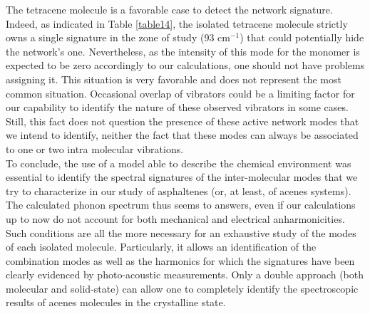 The tetracene molecule is a favorable case to detect the network signature. Indeed, as indicated in Table \ref{table14}, the isolated tetracene molecule strictly owns a single signature in the zone of study (93 cm$^{-1}$) that could potentially hide the network’s one. Nevertheless, as the intensity of this mode for the monomer is expected to be zero accordingly to our calculations, one should not have problems assigning it. This situation is very favorable and does not represent the most common situation. Occasional overlap of vibrators could be a limiting factor for our capability to identify the nature of these observed vibrators in some cases. Still, this fact does not question the presence of these active network modes that we intend to identify, neither the fact that these modes can always be associated to one or two intra molecular vibrations. \\

 
 To conclude, the use of a model able to describe the chemical environment was essential to identify the spectral signatures of the inter-molecular modes that we try to characterize in our study of asphaltenes (or, at least, of acenes systems). The calculated phonon spectrum thus seems to answers, even if our calculations up to now do not account for both mechanical and electrical anharmonicities. Such conditions are all the more necessary for an exhaustive study of the modes of each isolated molecule. Particularly, it allows an identification of the combination modes as well as the harmonics for which the signatures have been clearly evidenced by photo-acoustic measurements. Only a double approach (both molecular and solid-state) can allow one to completely identify the spectroscopic results of acenes molecules in the crystalline state.
 

